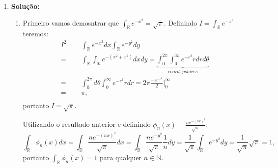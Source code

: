 \documentclass{article}
\begin{document}
\begin{enumerate}
		\item \textbf{Solução:} 
			\begin{enumerate}
				\item Primeiro vamos demosntrar que $\int_{\mathbb{R}} e^{-x^{2}} = \sqrt{\pi}$. Definindo $I= \int_{\mathbb{R}} e^{-x^{2}}$ teremos:
				$$
				\begin{aligned}
				I^{2} 
				= & \int_{\mathbb{R}} e^{-x^{2}} dx \int_{\mathbb{R}} e^{-y^{2}} dy \\
				= & \int_{\mathbb{R}} \int_{\mathbb{R}} e^{-(x^{2}+x^{2})} dxdy
				= \underbrace{ \int_{0}^{2\pi} \int_{0}^{\infty} e^{-r^{2}} rdr d\theta }_{coord. \; polares}\\
				= & \int_{0}^{2\pi} d\theta \int_{0}^{\infty} e^{-r^{2}} rdr = 2\pi \frac{-e^{-r^{2}}}{2} \Big|_{0}^{\infty} \\
				= & \pi, \\
				\end{aligned}
				$$
				portanto $I = \sqrt{\pi}$.
				
				
				Utilizando o resultado anterior e definindo $\phi_{n}(x) = \frac{ne^{-(nx)^{2}}}{\sqrt{\pi}}$:
				$$
				\int_{\mathbb{R}}\phi_{n}(x)dx= 				\int_{\mathbb{R}} \frac{ne^{-(nx)^{2}}}{\sqrt{\pi}} dx = \int_{\mathbb{R}} \frac{ne^{-y^{2}}}{\sqrt{\pi}} \frac{1}{n} dy = \frac{1}{\sqrt{\pi}} \int_{\mathbb{R}} e^{-y^{2}} dy = \frac{1}{\sqrt{\pi}}  \sqrt{\pi} = 1,
				$$
				portanto $\int_{\mathbb{R}}\phi_{n}(x) = 1$ para qualquer $n \in \mathbb{N}$.
				

\end{enumerate}
\end{enumerate}
\end{document}
